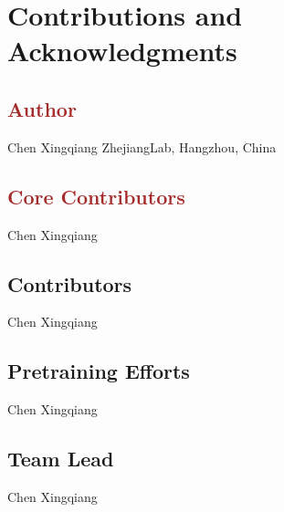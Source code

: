 \newpage
\section*{Contributions and Acknowledgments}

\subsection*{\textcolor{brown}{Author}}
Chen Xingqiang 
ZhejiangLab, Hangzhou, China


\subsection*{\textcolor{brown}{Core Contributors}}
Chen Xingqiang 

\subsection*{Contributors}
Chen Xingqiang 

\subsection*{Pretraining Efforts}
Chen Xingqiang 

\subsection*{Team Lead}
Chen Xingqiang 

